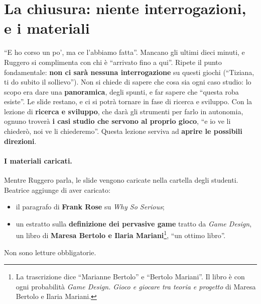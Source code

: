 \section{La chiusura: niente interrogazioni, e i materiali}
\label{a2:sec:chiusura}

``E ho corso un po', ma ce l'abbiamo fatta''. Mancano gli ultimi dieci minuti, e
Ruggero si complimenta con chi è ``arrivato fino a qui''. Ripete il punto
fondamentale: \textbf{non ci sarà nessuna interrogazione} su questi giochi
(``Tiziana, ti do subito il sollievo''). Non si chiede di sapere che cosa sia ogni
caso studio: lo scopo era dare una \textbf{panoramica}, degli spunti, e far
sapere che ``questa roba esiste''. Le slide restano, e ci si potrà tornare in
fase di ricerca e sviluppo. Con la lezione di \textbf{ricerca e sviluppo}, che
darà gli strumenti per farlo in autonomia, ognuno troverà \textbf{i casi studio
che servono al proprio gioco}, ``e io ve li chiederò, noi ve li chiederemo''.
Questa lezione serviva ad \textbf{aprire le possibili direzioni}.

\paragraph{I materiali caricati.} Mentre Ruggero parla, le slide vengono
caricate nella cartella degli studenti. Beatrice aggiunge di aver caricato:
\begin{itemize}
  \item il paragrafo di \textbf{Frank Rose} su \emph{Why So Serious};
  \item un estratto sulla \textbf{definizione dei pervasive game} tratto da
        \emph{Game Design}, un libro di \textbf{Maresa Bertolo e Ilaria
        Mariani}\footnote{La trascrizione dice ``Marianne Bertolo'' e
        ``Bertolo Mariani''. Il libro è con ogni probabilità \emph{Game
        Design. Gioco e giocare tra teoria e progetto} di Maresa Bertolo e Ilaria
        Mariani.}, ``un ottimo libro''.
\end{itemize}
Non sono letture obbligatorie.

